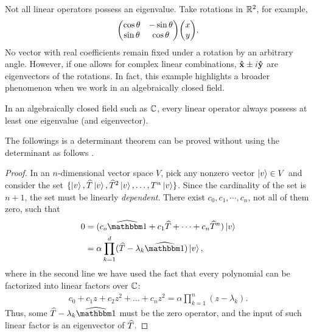Not all linear operators possess an eigenvalue. Take rotations in $\mathbb R^2$, for example,
\begin{align}
	\mqty(\cos\theta & -\sin\theta \\ \sin\theta & \cos\theta)\mqty(x \\ y).
\end{align}
No vector with real coefficients remain fixed under a rotation by an arbitrary angle. However, if one allows for complex linear combinations, ${\bf \hat{x}}\pm i{\bf \hat{y}}$ are eigenvectors of the rotations. In fact, this example highlights a broader phenomenon when we work in an algebraically closed field.


\begin{theorem}\label{thm:eigenvalue-exists}
	In an algebraically closed field such as $\mathbb C$, every linear operator always possess at least one eigenvalue (and eigenvector).
\end{theorem}
\noindent The followings is a determinant  theorem can be proved without using the determinant as follows \cite{axler}.
\begin{proof}
	In an $n$-dimensional vector space $V$,
	pick any nonzero vector $\ket{v}\in V$ and consider the set $\{\ket{v},\widehat{T}\ket{v},\widehat{T}^2 \ket{v},\dots,T^n \ket{v}\}$. Since the cardinality of the set is $n+1$, the set must be linearly \emph{dependent}. There exist $c_0,c_1,\cdots,c_n$, not all of them zero, such that
	\begin{align}
		0 &= (c_o\op\id + c_1\op T + \cdots + c_n\op T^n)\ket{v} \\
		&= \alpha \prod_{k=1}^d (\op T-\lambda_k \op\id) \ket{v},
	\end{align}
	where in the second line we have used the fact that every polynomial can be factorized into linear factors over $\mathbb C$:
	\begin{align}
		c_0 + c_1z + c_2z^2 +\dots+c_nz^2 = \alpha \prod_{k=1}^n(z-\lambda_k).
	\end{align}
	Thus, some $\op T -\lambda_k\op\id$ must be the zero operator, and the input of such linear factor is an eigenvector of $\widehat{T}$.
\end{proof}


